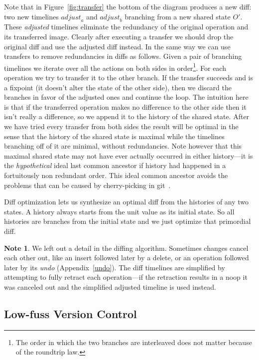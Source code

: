 \documentclass[english,submission]{programming}
\theoremstyle{definition}
\newtheorem*{note}{Note}
\newcommand{\mathbox}[1]{\colorbox{black!10}{$#1$\phantom{i\hspace{-3.5pt}}}}
\begin{document}
Note that in Figure~\ref{fig:transfer} the bottom of the diagram produces a new diff: two new timelines \mathbox{\mathit{adjust}_a} and \mathbox{\mathit{adjust}_b} branching from a new shared state \mathbox{O'}. These \textit{adjusted} timelines eliminate the redundancy of the original operation and its transferred image. Clearly after executing a transfer we should drop the original diff and use the adjusted diff instead. In the same way we can use transfers to remove redundancies in diffs as follows. Given a pair of branching timelines we iterate over all the actions on both sides in order\footnote{The order in which the two branches are interleaved does not matter because of the roundtrip law.}. For each operation we try to transfer it to the other branch. If the transfer succeeds and is a fixpoint (it doesn't alter the state of the other side), then we discard the branches in favor of the adjusted ones and continue the loop. The intuition here is that if the transferred operation makes no difference to the other side then it isn't really a difference, so we append it to the history of the shared state. After we have tried every transfer from both sides the result will be optimal in the sense that the history of the shared state is maximal while the timelines branching off of it are minimal, without redundancies. Note however that this maximal shared state may not have ever actually occurred in either history---it is the \textit{hypothetical} ideal last common ancestor if history had happened in a fortuitously non redundant order. This ideal common ancestor avoids the problems that can be caused by cherry-picking in git~\cite{philomatics-git}.

Diff optimization lets us synthesize an optimal diff from the histories of any two states. A history always starts from the unit value as its initial state. So all histories are branches from the initial state and we just optimize that primordial diff.

\begin{note}
  We left out a detail in the diffing algorithm. Sometimes changes cancel each other out, like an insert followed later by a delete, or an operation followed later by its \textit{undo} (Appendix~\ref{undo}). The diff timelines are simplified by attempting to fully retract each operation---if the retraction results in a \textsf{noop} it was canceled out and the simplified adjusted timeline is used instead.
\end{note}

\subsection{Low-fuss Version Control}
\end{document}
